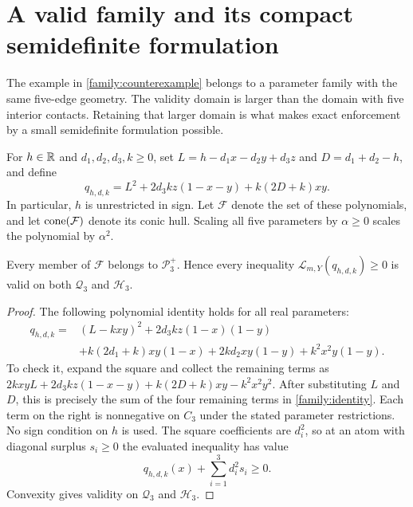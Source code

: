 \section{A valid family and its compact semidefinite formulation}
\label{family:section}

The example in \cref{family:counterexample} belongs to a parameter family
with the same five-edge geometry. The validity domain is larger than the
domain with five interior contacts. Retaining that larger domain is what
makes exact enforcement by a small semidefinite formulation possible.

For $h\in\mathbb R$ and $d_1,d_2,d_3,k\ge0$, set
$L=h-d_1x-d_2y+d_3z$ and $D=d_1+d_2-h$, and define
\begin{equation}
\label{family:definition}
q_{h,d,k}=L^2+2d_3kz(1-x-y)+k(2D+k)xy.
\end{equation}
In particular, $h$ is unrestricted in sign. Let $\mathcal F$ denote the
set of these polynomials, and let $\operatorname{cone}(\mathcal F)$ denote its conic
hull. Scaling all five parameters by $\alpha\ge0$ scales the polynomial
by $\alpha^2$.

\begin{theorem}[Validity]
\label{family:valid}
Every member of $\mathcal F$ belongs to $\mathcal P_3^+$. Hence every
inequality $\mathcal L_{m,Y}(q_{h,d,k})\ge0$ is valid on both
$\mathcal Q_3$ and $\mathcal H_3$.
\end{theorem}

\begin{proof}
The following polynomial identity holds for all real parameters:
\begin{equation}
\label{family:identity}
\begin{split}
q_{h,d,k}={}&(L-kxy)^2+2d_3kz(1-x)(1-y)\\
 &+k(2d_1+k)xy(1-x)+2kd_2xy(1-y)
   +k^2x^2y(1-y).
\end{split}
\end{equation}
To check it, expand the square and collect the remaining terms as
$2kxyL+2d_3kz(1-x-y)+k(2D+k)xy-k^2x^2y^2$.
After substituting $L$ and $D$, this is precisely the sum of the four
remaining terms in \eqref{family:identity}.
Each term on the right is nonnegative on $C_3$ under the stated parameter
restrictions. No sign condition on $h$ is used. The square coefficients
are $d_i^2$, so at an atom with diagonal surplus $s_i\ge0$ the evaluated
inequality has value
\[
q_{h,d,k}(x)+\sum_{i=1}^3d_i^2s_i\ge0.
\]
Convexity gives validity on $\mathcal Q_3$ and $\mathcal H_3$.
\end{proof}

